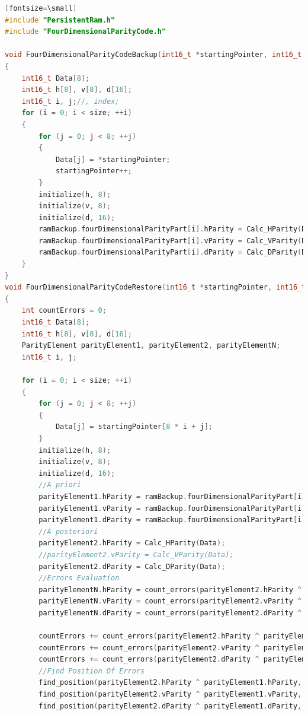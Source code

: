 \documentclass[LaM,binding=0.6cm]{../sapthesis}
\begin{document}
\begin{lstlisting}[language=c][fontsize=\small]
#include "PersistentRam.h"
#include "FourDimensionalParityCode.h"

void FourDimensionalParityCodeBackup(int16_t *startingPointer, int16_t size)
{
    int16_t Data[8];
    int16_t h[8], v[8], d[16];
    int16_t i, j;//, index;
    for (i = 0; i < size; ++i)
    {
        for (j = 0; j < 8; ++j)
        {
            Data[j] = *startingPointer;
            startingPointer++;
        }
        initialize(h, 8);
        initialize(v, 8);
        initialize(d, 16);
        ramBackup.fourDimensionalParityPart[i].hParity = Calc_HParity(Data);
        ramBackup.fourDimensionalParityPart[i].vParity = Calc_VParity(Data);
        ramBackup.fourDimensionalParityPart[i].dParity = Calc_DParity(Data);
    }
}
void FourDimensionalParityCodeRestore(int16_t *startingPointer, int16_t size)
{
    int countErrors = 0;
    int16_t Data[8];
    int16_t h[8], v[8], d[16];
    ParityElement parityElement1, parityElement2, parityElementN;
    int16_t i, j;

    for (i = 0; i < size; ++i)
    {
        for (j = 0; j < 8; ++j)
        {
            Data[j] = startingPointer[8 * i + j];
        }
        initialize(h, 8);
        initialize(v, 8);
        initialize(d, 16);
        //A priori
        parityElement1.hParity = ramBackup.fourDimensionalParityPart[i].hParity;
        parityElement1.vParity = ramBackup.fourDimensionalParityPart[i].vParity;
        parityElement1.dParity = ramBackup.fourDimensionalParityPart[i].dParity;
        //A posteriori
        parityElement2.hParity = Calc_HParity(Data);
        //parityElement2.vParity = Calc_VParity(Data);
        parityElement2.dParity = Calc_DParity(Data);
        //Errors Evaluation
        parityElementN.hParity = count_errors(parityElement2.hParity ^ parityElement1.hParity);
        parityElementN.vParity = count_errors(parityElement2.vParity ^ parityElement1.vParity);
        parityElementN.dParity = count_errors(parityElement2.dParity ^ parityElement1.dParity);

        countErrors += count_errors(parityElement2.hParity ^ parityElement1.hParity);
        countErrors += count_errors(parityElement2.vParity ^ parityElement1.vParity);
        countErrors += count_errors(parityElement2.dParity ^ parityElement1.dParity);
        //Find Position Of Errors
        find_position(parityElement2.hParity ^ parityElement1.hParity, h);
        find_position(parityElement2.vParity ^ parityElement1.vParity, v);
        find_position(parityElement2.dParity ^ parityElement1.dParity, d);


\end{lstlisting}
\end{document}
